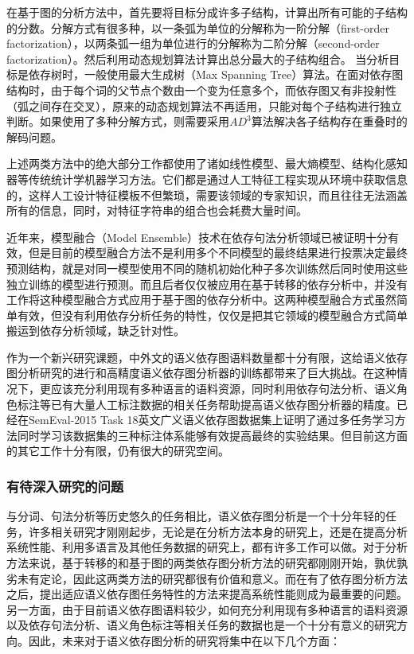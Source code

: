 在基于图的分析方法中，首先要将目标分成许多子结构，计算出所有可能的子结构的分数。分解方式有很多种，以一条弧为单位的分解称为一阶分解（first-order factorization），以两条弧一组为单位进行的分解称为二阶分解（second-order factorization）。然后利用动态规划算法计算出总分最大的子结构组合。
当分析目标是依存树时，一般使用最大生成树（Max Spanning Tree）算法。在面对依存图结构时，由于每个词的父节点个数由一个变为任意多个，而依存图又有非投射性（弧之间存在交叉），原来的动态规划算法不再适用，只能对每个子结构进行独立判断。如果使用了多种分解方式，则需要采用$AD^3$算法解决各子结构存在重叠时的解码问题。

上述两类方法中的绝大部分工作都使用了诸如线性模型、最大熵模型、结构化感知器等传统统计学机器学习方法。它们都是通过人工特征工程实现从环境中获取信息的，这样人工设计特征模板不但繁琐，需要该领域的专家知识，而且往往无法涵盖所有的信息，同时，对特征字符串的组合也会耗费大量时间。

近年来，模型融合（Model Ensemble）技术在依存句法分析领域已被证明十分有效，但是目前的模型融合方法不是利用多个不同模型的最终结果进行投票决定最终预测结构，就是对同一模型使用不同的随机初始化种子多次训练然后同时使用这些独立训练的模型进行预测。而且后者仅仅被应用在基于转移的依存分析中，并没有工作将这种模型融合方式应用于基于图的依存分析中。这两种模型融合方式虽然简单有效，但没有利用依存分析任务的特性，仅仅是把其它领域的模型融合方式简单搬运到依存分析领域，缺乏针对性。

作为一个新兴研究课题，中外文的语义依存图语料数量都十分有限，这给语义依存图分析研究的进行和高精度语义依存图分析器的训练都带来了巨大挑战。在这种情况下，更应该充分利用现有多种语言的语料资源，同时利用依存句法分析、语义角色标注等已有大量人工标注数据的相关任务帮助提高语义依存图分析器的精度。已经在SemEval-2015 Task 18英文广义语义依存图数据集上证明了通过多任务学习方法同时学习该数据集的三种标注体系能够有效提高最终的实验结果。但目前这方面的其它工作十分有限，仍有很大的研究空间。

\subsubsection{有待深入研究的问题}

与分词、句法分析等历史悠久的任务相比，语义依存图分析是一个十分年轻的任务，许多相关研究才刚刚起步，无论是在分析方法本身的研究上，还是在提高分析系统性能、利用多语言及其他任务数据的研究上，都有许多工作可以做。对于分析方法来说，基于转移的和基于图的两类依存图分析方法的研究都刚刚开始，孰优孰劣未有定论，因此这两类方法的研究都很有价值和意义。而在有了依存图分析方法之后，提出适应语义依存图任务特性的方法来提高系统性能则成为最重要的问题。另一方面，由于目前语义依存图语料较少，如何充分利用现有多种语言的语料资源以及依存句法分析、语义角色标注等相关任务的数据也是一个十分有意义的研究方向。因此，未来对于语义依存图分析的研究将集中在以下几个方面：

